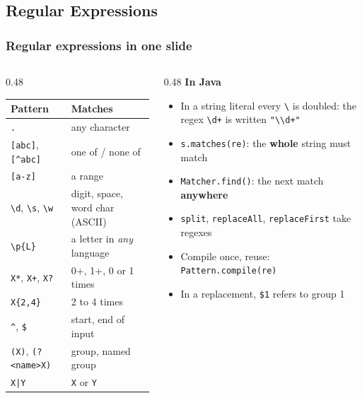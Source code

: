 \documentclass[aspectratio=169,10pt,compress]{beamer}
\begin{document}
\subsection[Regex]{Regular Expressions}{}{}




\begin{frame}[t,fragile] \frametitle{Regular expressions in one slide}
  \footnotesize
  \begin{columns}[T]
    \begin{column}{0.48\textwidth}
      \begin{tabular}{@{}ll@{}}
        \toprule
        \textbf{Pattern} & \textbf{Matches} \\
        \midrule
        \texttt{.}                & any character \\
        \texttt{[abc]}, \texttt{[\textasciicircum abc]} & one of / none of \\
        \texttt{[a-z]}            & a range \\
        \texttt{\textbackslash d}, \texttt{\textbackslash s}, \texttt{\textbackslash w} & digit, space, word char (ASCII) \\
        \texttt{\textbackslash p\{L\}}  & a letter in \emph{any} language \\
        \texttt{X*}, \texttt{X+}, \texttt{X?} & 0+, 1+, 0 or 1 times \\
        \texttt{X\{2,4\}}         & 2 to 4 times \\
        \texttt{\textasciicircum}, \texttt{\$} & start, end of input \\
        \texttt{(X)}, \texttt{(?<name>X)} & group, named group \\
        \texttt{X|Y}              & \texttt{X} or \texttt{Y} \\
        \bottomrule
      \end{tabular}
    \end{column}
    \begin{column}{0.48\textwidth}
      \textbf{In Java}
      \begin{itemize}
        \item In a string literal every \texttt{\textbackslash} is doubled: the regex \texttt{\textbackslash d+} is written \texttt{"\textbackslash\textbackslash d+"}
        \item \texttt{s.matches(re)}: the \textbf{whole} string must match
        \item \texttt{Matcher.find()}: the next match \textbf{anywhere}
        \item \texttt{split}, \texttt{replaceAll}, \texttt{replaceFirst} take regexes
        \item Compile once, reuse: \texttt{Pattern.compile(re)}
        \item In a replacement, \texttt{\$1} refers to group 1
      \end{itemize}
    \end{column}
  \end{columns}
\end{frame}
\end{document}
